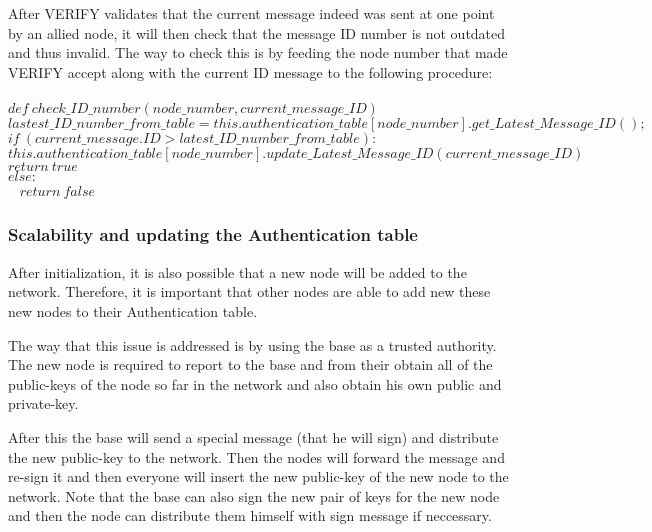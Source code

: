 \documentclass[letterpaper]{article}
\begin{document}
After \textsc{VERIFY} validates that the current message indeed was sent at one point by an allied node, it will then check that the message ID number
is not outdated and thus invalid. The way to check this is by feeding the node number that made VERIFY accept along with the current ID message to the
following procedure:\\ \\
$def \ check\_ID\_number(node\_number, current\_message\_ID)$ \\
\hspace*{10 mm} $lastest\_ID\_number\_from\_table = this.authentication\_table[node\_number].get\_Latest\_Message\_ID();$
\hspace*{10 mm} $if \ (current\_message.ID > latest\_ID\_number\_from\_table):$\\
\hspace*{20 mm} $this.authentication\_table[node\_number].update\_Latest\_Message\_ID(current\_message\_ID)$\\
\hspace*{20 mm} $return \ true$ \\
\hspace*{10 mm} $else:$\\ \ 
\hspace*{20 mm} $return \ false$\\


\subsubsection{Scalability and updating the Authentication table}

After initialization, it is also possible that a new node will be added to the network. 
Therefore, it is important that other nodes are able to add new these new nodes to their Authentication table.

The way that this issue is addressed is by using the base as a trusted authority.
The new node is required to report to the base and from their obtain all of the public-keys of the node so far in the network and also obtain his own public and private-key. 

After this the base will send a special message (that he will sign) and distribute the new public-key to the network. 
Then the nodes will forward the message and re-sign it and then everyone will insert the new public-key of the new node to the network. Note that the base can also sign the new pair of keys for the new node and then the node can distribute them himself with sign message if neccessary.
\end{document}

